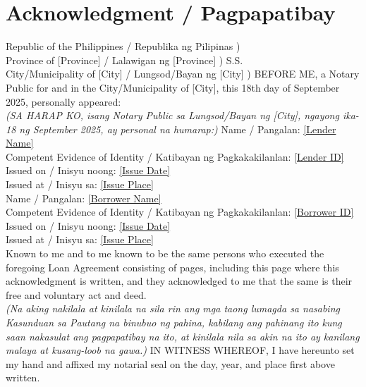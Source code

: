 \documentclass[a4paper,12pt]{article}
\begin{document}
\section*{Acknowledgment / Pagpapatibay}
Republic of the Philippines / Republika ng Pilipinas ) \\
Province of [Province] / Lalawigan ng [Province] ) S.S. \\
City/Municipality of [City] / Lungsod/Bayan ng [City] )
\vspace{0.5cm}
BEFORE ME, a Notary Public for and in the City/Municipality of [City], this 18th day of September 2025, personally appeared: \\
\textit{(SA HARAP KO, isang Notary Public sa Lungsod/Bayan ng [City], ngayong ika-18 ng September 2025, ay personal na humarap:)}
\vspace{0.3cm}
Name / Pangalan: \underline{[Lender Name]} \\
Competent Evidence of Identity / Katibayan ng Pagkakakilanlan: \underline{[Lender ID]} \\
Issued on / Inisyu noong: \underline{[Issue Date]} \\
Issued at / Inisyu sa: \underline{[Issue Place]} \\
\vspace{0.3cm}
Name / Pangalan: \underline{[Borrower Name]} \\
Competent Evidence of Identity / Katibayan ng Pagkakakilanlan: \underline{[Borrower ID]} \\
Issued on / Inisyu noong: \underline{[Issue Date]} \\
Issued at / Inisyu sa: \underline{[Issue Place]} \\
\vspace{0.5cm}
Known to me and to me known to be the same persons who executed the foregoing Loan Agreement consisting of \pageref{LastPage} pages, including this page where this acknowledgment is written, and they acknowledged to me that the same is their free and voluntary act and deed. \\
\textit{(Na aking nakilala at kinilala na sila rin ang mga taong lumagda sa nasabing Kasunduan sa Pautang na binubuo ng \pageref{LastPage} pahina, kabilang ang pahinang ito kung saan nakasulat ang pagpapatibay na ito, at kinilala nila sa akin na ito ay kanilang malaya at kusang-loob na gawa.)}
\vspace{0.5cm}
IN WITNESS WHEREOF, I have hereunto set my hand and affixed my notarial seal on the day, year, and place first above written. \\
\end{document}
